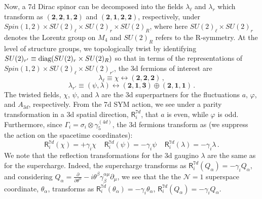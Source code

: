 \documentclass[12pt]{article}%
\numberwithin{equation}{section}
\renewcommand{\(}{\left(}
\renewcommand{\)}{\right)}
\renewcommand{\[}{\left[}
\renewcommand{\]}{\right]}
\begin{document}
Now, a 7d Dirac spinor can be decomposed into the fields $\lambda_\ell$ and $\lambda_r$ which transform as $(\textbf{2},\textbf{2},\textbf{1},\textbf{2})$ and $(\textbf{2},\textbf{1},\textbf{2},\textbf{2})$, respectively, under $Spin(1,2)\times SU(2)_\ell\times SU(2)_r \times SU(2)_R$, where here $SU(2)_\ell\times SU(2)_r$ denotes the Lorentz group on $M_4$ and $SU(2)_R$ refers to the R-symmetry. At the level of structure groups, we topologically twist by identifying $SU(2)_{r'} \equiv \textnormal{diag}(SU(2)_r \times SU(2)_R)$ so that in terms of the representations of $Spin(1,2)\times SU(2)_\ell\times SU(2)_{r'}$, the 3d fermions of interest are
\begin{equation}
\lambda_\ell\equiv \chi  \leftrightarrow (\textbf{2},\textbf{2},\textbf{2})\,,
\end{equation}
\begin{equation}
\lambda_{r'}\equiv (\psi,\lambda)  \leftrightarrow  (\textbf{2},\textbf{1},\textbf{3})\oplus (\textbf{2},\textbf{1},\textbf{1})\,.
\end{equation}
The twisted fields, $\chi$, $\psi$, and $\lambda$ are the 3d superpartners for the fluctuations $a$, $\varphi$, and $A_{3d}$, respectively.
From the 7d SYM action, we see under a parity transformation in a 3d spatial direction, $\mathsf{R}^{7d}_i$, that $a$ is even, while $\varphi$
is odd. Furthermore, since $\Gamma_i=\sigma_i\otimes \gamma^{(4d)}_5$, the 3d fermions transform as (we suppress the action on the spacetime coordinates):
\begin{equation}\label{eqn:parities}
\mathsf{R}^{7d}_i(\chi)=+\gamma_i \chi \; \; \;  \; \mathsf{R}^{7d}_i(\psi)=-\gamma_i \psi \;\; \; \; \mathsf{R}^{7d}_i(\lambda)=-\gamma_i \lambda\,.
\end{equation}
We note that the reflection transformations for the 3d gaugino $\lambda$ are the same as for the supercharge. Indeed, the supercharge transforms as $\mathsf{R}^{7d}_i(Q_\alpha)=-\gamma_iQ_\alpha$, and considering $Q_{\alpha}=\frac{\partial}{\partial \theta^\alpha}-i\theta^\beta \gamma_{\beta}^{\alpha \mu}\partial_\mu$, we see that the the $\mathcal{N}=1$ superspace coordinate, $\theta_\alpha$, transforms as $\mathsf{R}^{7d}_i(\theta_\alpha)=-\gamma_i\theta_\alpha$, $\mathsf{R}^{7d}_i(Q_\alpha)=-\gamma_iQ_\alpha$.
\end{document}
